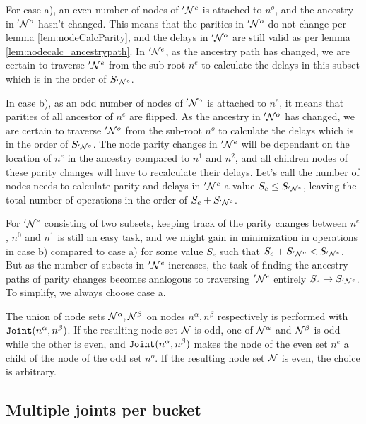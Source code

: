 For case a), an even number of nodes of $'\mathcal{N}^e$ is attached to $n^o$, and the ancestry in $'\mathcal{N}^o$ hasn't changed. This means that the parities in $'\mathcal{N}^o$ do not change per lemma \ref{lem:nodeCalcParity}, and the delays in $'\mathcal{N}^o$ are still valid as per lemma \ref{lem:nodecalc_ancestrypath}. In $'\mathcal{N}^e$, as the ancestry path has changed, we are certain to traverse $'\mathcal{N}^e$ from the sub-root $n^e$ to calculate the delays in this subset which is in the order of $S_{'\mathcal{N}^e}$.

In case b), as an odd number of nodes of $'\mathcal{N}^o$ is attached to $n^e$, it means that parities of all ancestor of $n^e$ are flipped. As the ancestry in $'\mathcal{N}^{o}$ has changed, we are certain to traverse $'\mathcal{N}^o$ from the sub-root $n^o$ to calculate the delays which is in the order of $S_{'\mathcal{N}^o}$. The node parity changes in $'\mathcal{N}^e$ will be dependant on the location of $n^e$ in the ancestry compared to $n^1$ and $n^2$, and all children nodes of these parity changes will have to recalculate their delays. Let's call the number of nodes needs to calculate parity and delays in $'\mathcal{N}^e$ a value $S_e \leq S_{'\mathcal{N}^e}$, leaving the total number of operations in the order of $S_e + S_{'\mathcal{N}^o}$.

For $'\mathcal{N}^e$ consisting of two subsets, keeping track of the parity changes between $n^e$, $n^0$ and $n^1$ is still an easy task, and we might gain in minimization in operations in case b) compared to case a) for some value $S_e$ such that $S_e + S_{'\mathcal{N}^o} < S_{'\mathcal{N}^e}$. But as the number of subsets in $'\mathcal{N}^e$ increases, the task of finding the ancestry paths of parity changes becomes analogous to traversing $'\mathcal{N}^e$ entirely $S_e \rightarrow S_{'\mathcal{N}^e}$. To simplify, we always choose case a.

\begin{theorem}\label{the:nodejoint}
  The union of node sets $\mathcal{N}^\alpha, \mathcal{N}^\beta$ on nodes $n^\alpha, n^\beta$ respectively is performed with $\texttt{Joint}(n^\alpha, n^\beta)$. If the resulting node set $\mathcal{N}$ is odd, one of $\mathcal{N}^\alpha$ and $ \mathcal{N}^\beta$ is odd while the other is even, and $\texttt{Joint}(n^\alpha, n^\beta)$ makes the node of the even set $n^e$ a child of the node of the odd set $n^o$. If the resulting node set $\mathcal{N}$ is even, the choice is arbitrary.
\end{theorem}



\subsection{Multiple joints per bucket}\label{sec:multiplejoint}

